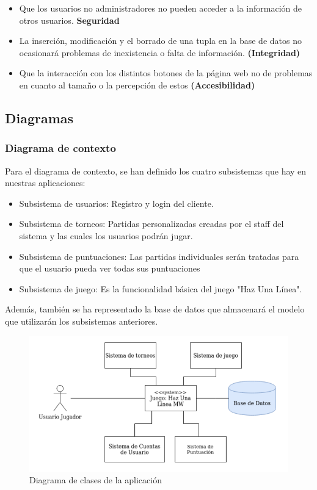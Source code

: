 \documentclass{article}
\begin{document}
\begin{itemize}
\begin{itemize}
    \item Que los usuarios no administradores no pueden acceder a la información de otros usuarios. \textbf{Seguridad}
    
    \item La inserción, modificación y el borrado de una tupla en la base de datos no ocasionará problemas de inexistencia o falta de información. \textbf{(Integridad)}

    \item Que la interacción con los distintos botones de la página web no de problemas en cuanto al tamaño o la percepción de estos \textbf{(Accesibilidad)}
  \end{itemize}
\end{itemize}

\subsection{Diagramas}
\subsubsection{Diagrama de contexto}
Para el diagrama de contexto, se han definido los cuatro subsistemas que hay en nuestras aplicaciones:
\begin{itemize}
\item Subsistema de usuarios: Registro y login del cliente.  
\item Subsistema de torneos: Partidas personalizadas creadas por el staff del sistema y las cuales los usuarios podrán jugar. 
\item Subsistema de puntuaciones: Las partidas individuales serán tratadas para que el usuario pueda ver todas sus puntuaciones
\item Subsistema de juego: Es la funcionalidad básica del juego "Haz Una Línea".
\end{itemize}

Además, también se ha representado la base de datos que almacenará el modelo que utilizarán los subsistemas anteriores.
  \begin{figure}[H]
  \includegraphics[width=\textwidth]{imagenes/contexto.png}
  \caption{Diagrama de clases de la aplicación} 
\end{figure}
\end{document}
